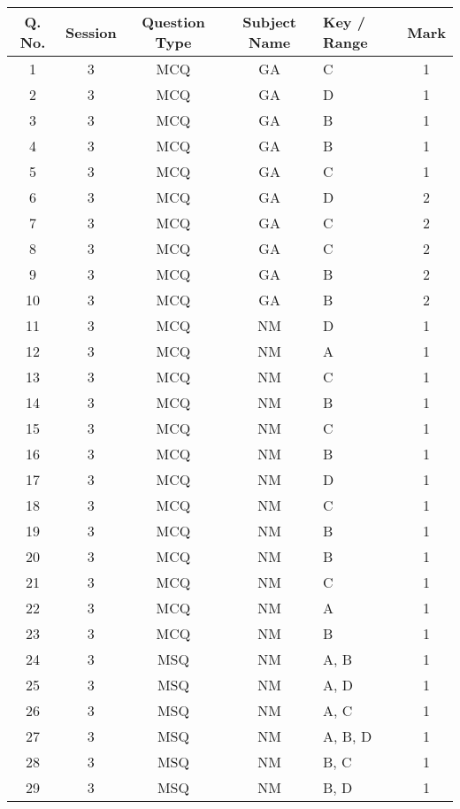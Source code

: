 \begin{table}
	\begin{center}
\begin{tabular}[12pt]{|c|c|c|c|l|c|}

\hline
Q. No. & Session &  Question Type & Subject Name  & Key / Range & Mark \\
\hline

1  & 3 & MCQ & GA & C & 1 \\
\hline
2  & 3 & MCQ & GA & D & 1 \\
\hline
3  & 3 & MCQ & GA & B & 1 \\
\hline
4  & 3 & MCQ & GA & B & 1 \\
\hline
5  & 3 & MCQ & GA & C & 1 \\
\hline
6  & 3 & MCQ & GA & D & 2 \\
\hline
7  & 3 & MCQ & GA & C & 2 \\
\hline
8  & 3 & MCQ & GA & C & 2 \\
\hline
9  & 3 & MCQ & GA & B & 2 \\
\hline
10 & 3 & MCQ & GA & B & 2 \\
\hline
11 & 3 & MCQ & NM & D & 1 \\
\hline
12 & 3 & MCQ & NM & A & 1 \\
\hline
13 & 3 & MCQ & NM & C & 1 \\
\hline
14 & 3 & MCQ & NM & B & 1 \\
\hline
15 & 3 & MCQ & NM & C & 1 \\
\hline
16 & 3 & MCQ & NM & B & 1 \\
\hline
17 & 3 & MCQ & NM & D & 1 \\
\hline
18 & 3 & MCQ & NM & C & 1 \\
\hline
19 & 3 & MCQ & NM & B & 1 \\
\hline
20 & 3 & MCQ & NM & B & 1 \\
\hline
21 & 3 & MCQ & NM & C & 1 \\
\hline
22 & 3 & MCQ & NM & A & 1 \\
\hline
23 & 3 & MCQ & NM & B & 1 \\
\hline
24 & 3 & MSQ & NM & A, B & 1 \\
\hline
25 & 3 & MSQ & NM & A, D & 1 \\
\hline
26 & 3 & MSQ & NM & A, C & 1 \\
\hline
27 & 3 & MSQ & NM & A, B, D & 1 \\
\hline
28 & 3 & MSQ & NM & B, C & 1 \\
\hline
29 & 3 & MSQ & NM & B, D & 1 \\

\end{tabular}
\end{center}
\end{table}
